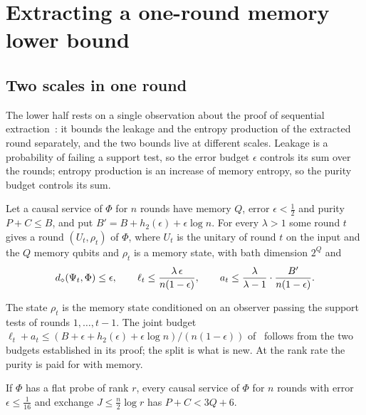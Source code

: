 \section{Extracting a one-round memory lower bound}\label{sec:lower}

\subsection{Two scales in one round}

The lower half rests on a single observation about the proof of sequential extraction~\cite[Theorem~5.2]{DouglasMghirbiB}: it bounds the
leakage and the entropy production of the extracted round separately, and the two bounds live at different scales. Leakage is a
probability of failing a support test, so the error budget $\epsilon$ controls its sum over the rounds; entropy production is an increase of
memory entropy, so the purity budget controls its sum.

\begin{theorem}\label{thm:extraction}
Let a causal service of $\Phi$ for $n$ rounds have memory $Q$, error $\epsilon<\frac12$ and purity $P+C\le B$, and put
$B'=B+h_2(\epsilon)+\epsilon\log n$. For every $\lambda>1$ some round $t$ gives a round $(U_t,\rho_t)$ of $\Phi$, where $U_t$ is the unitary of
round $t$ on the input and the $Q$ memory qubits and $\rho_t$ is a memory state, with bath dimension $2^Q$ and
\[
d_\diamond(\Psi_t,\Phi)\le\epsilon,\qquad \ell_t\le\frac{\lambda\,\epsilon}{n(1-\epsilon)},\qquad a_t\le\frac{\lambda}{\lambda-1}\cdot\frac{B'}{n(1-\epsilon)} .
\]
\end{theorem}

The state $\rho_t$ is the memory state conditioned on an observer passing the support tests of rounds $1,\dots,t-1$. The joint budget
$\ell_t+a_t\le(B+\epsilon+h_2(\epsilon)+\epsilon\log n)/(n(1-\epsilon))$ of~\cite[Theorem~5.2]{DouglasMghirbiB} follows from the two budgets
established in its proof; the split is what is new. At the rank rate the purity is paid for with memory.

\begin{proposition}\label{prop:purity}
If $\Phi$ has a flat probe of rank $r$, every causal service of $\Phi$ for $n$ rounds with error $\epsilon\le\frac1{16}$ and exchange
$J\le\frac n2\log r$ has $P+C<3Q+6$.
\end{proposition}

